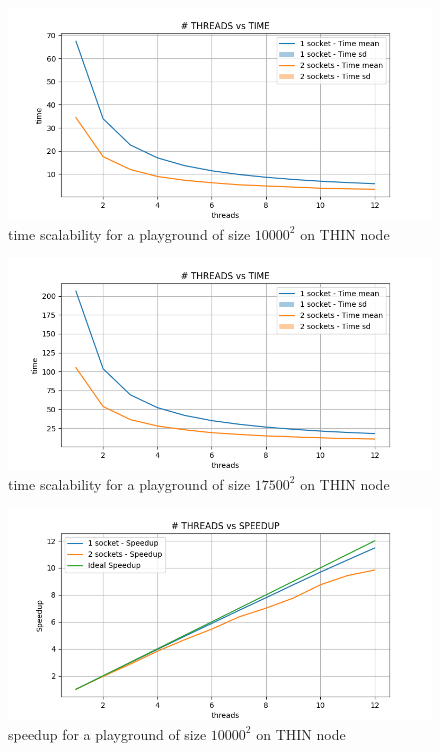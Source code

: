 \documentclass[12pt, titlepage]{report}
\begin{document}
\begin{figure}[H]
	\centering
	\includegraphics[width=\textwidth]{Assignment-1/OMP-static-10000-10-THIN-1sockettime.png}
	\caption{time scalability for a playground of size $10000^2$ on THIN node}
\end{figure}
\begin{figure}[H]
	\centering
	\includegraphics[width=\textwidth]{Assignment-1/OMP-static-17500-10-THIN-1sockettime.png}
	\caption{time scalability for a playground of size $17500^2$ on THIN node}
\end{figure}
\begin{figure}[H]
	\centering
	\includegraphics[width=\textwidth]{Assignment-1/OMP-static-10000-10-THIN-1socketspeedUp.png}
	\caption{speedup for a playground of size $10000^2$ on THIN node}
\end{figure}
\end{document}
